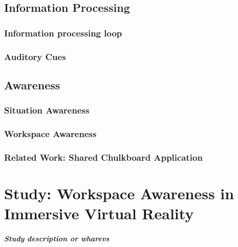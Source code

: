 \section{Information Processing}
\subsection{Information processing loop}
\subsection{Auditory Cues}
\section{Awareness} %
\subsection{Situation Awareness}
\subsection{Workspace Awareness}
\subsection{Related Work: Shared Chulkboard Application}


\chapter{Study: Workspace Awareness in Immersive Virtual Reality}
\paragraph{Study description or wharevs}

